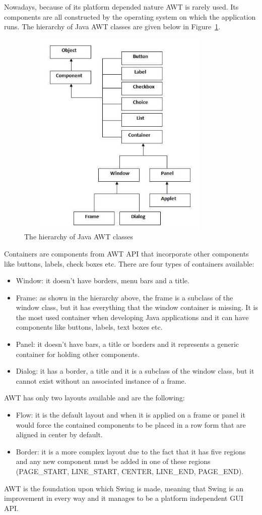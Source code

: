 \documentclass[12pt,a4paper]{report}
\begin{document}
Nowadays, because of its platform depended nature AWT is rarely used. Its components are all constructed by the operating system on which the application runs. The hierarchy of Java AWT classes are given below in Figure~\ref{fig:awt}.
\begin{figure}[!ht]
	\centering
	\includegraphics[width=10cm,height=10cm]{pics/awthierarchy.jpg}
	\caption{The hierarchy of Java AWT classes}
	\label{fig:awt}
\end{figure}
\newpage
Containers are components from AWT API that incorporate other components like buttons, labels, check boxes etc. There are four types of containers available:
\begin{itemize}
	\item Window: it doesn't have borders, menu bars and a title.
	\item Frame: as shown in the hierarchy above, the frame is a subclass of the window class, but it has everything that the window container is missing. It is the most used container when developing Java applications and it can have components like buttons, labels, text boxes etc.
	\item Panel: it doesn't have bars, a title or borders and it represents a generic container for holding other components.
	\item Dialog: it has a border, a title and it is a subclass of the window class, but it cannot exist without an associated instance of a frame.   
\end{itemize}
AWT has only two layouts available and are the following:
\begin{itemize}
	\item Flow: it is the default layout and when it is applied on a frame or panel it would force the contained components to be placed in a row form that are aligned in center by default.  
	\item Border: it is a more complex layout due to the fact that it has five regions and any new component must be added in one of these regions (PAGE\_START, LINE\_START, CENTER, LINE\_END, PAGE\_END). 
\end{itemize}
AWT is the foundation upon which Swing is made, meaning that Swing is an improvement in every way and it manages to be a platform independent GUI API.
\end{document}
